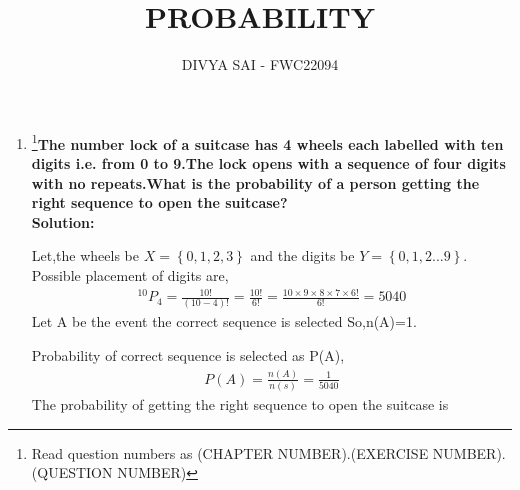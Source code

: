 \documentclass{article}
\providecommand{\cbrak}[1]{\ensuremath{\left\{#1\right\}}}
\begin{document}
\title{PROBABILITY}
\author{\Large DIVYA SAI - FWC22094}
\date{}

\maketitle
\begin{enumerate}[label=16.\arabic{enumi}.\arabic{enumii}]%
\setcounter{enumi}{3}
\setcounter{enumii}{10}

\item \footnote{Read question numbers as (CHAPTER NUMBER).(EXERCISE NUMBER).(QUESTION NUMBER)}\textbf {The number lock of a suitcase has 4 wheels each labelled with ten digits i.e. from 0 to 9.The lock opens with a sequence of four digits with no repeats.What is the probability of a person getting the right sequence to open the suitcase?}\\[1ex]

\textbf{Solution:}

Let,the wheels be $X =\cbrak{0,1,2,3}$ and the digits be $Y=\cbrak{0,1,2...9}$.
Possible placement of digits are,
\begin{align}
^{10}P_4=\frac{10!}{(10-4)!}=\frac{10!}{6!}=\frac{10 \times 9 \times 8 \times 7 \times	 6!}{6!}=5040
\end{align}
Let A be the event the correct sequence is selected So,n(A)=1.

Probability of correct sequence is selected as P(A),
\begin{align}
P(A)=\frac{n(A)}{n(s)}=\frac{1}{5040}
\end{align}
The probability of getting the right sequence to open the suitcase is 
\end{enumerate}
\end{document}
